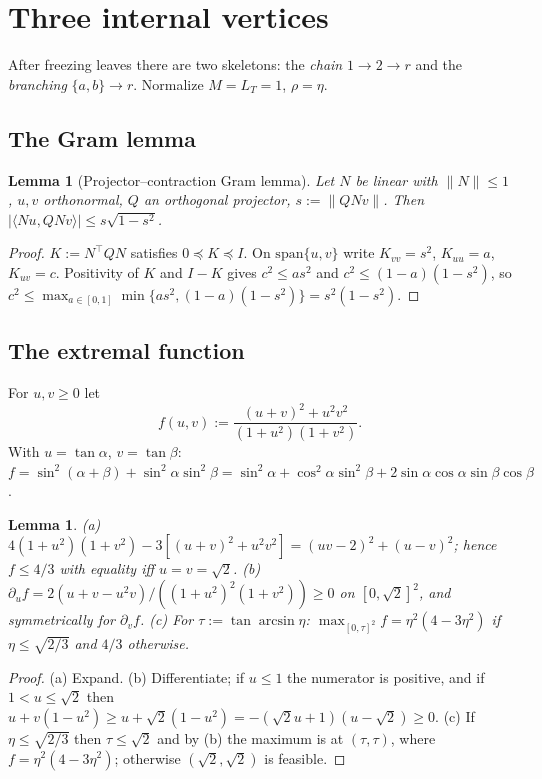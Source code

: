 \documentclass[11pt]{amsart}
\newtheorem{lemma}[theorem]{Lemma}
\theoremstyle{definition}
\newcommand{\norm}[1]{\lVert #1\rVert}
\newcommand{\ip}[2]{\langle #1,#2\rangle}
\begin{document}
\section{Three internal vertices}

After freezing leaves there are two skeletons: the \emph{chain} $1\to2\to r$ and
the \emph{branching} $\{a,b\}\to r$. Normalize $M=L_T=1$, $\rho=\eta$.

\subsection{The Gram lemma}

\begin{lemma}[Projector--contraction Gram lemma]\label{lem:gram}
Let $N$ be linear with $\norm{N}\le1$, $u,v$ orthonormal, $Q$ an orthogonal projector,
$s:=\norm{QNv}$. Then $\lvert\ip{Nu}{QNv}\rvert\le s\sqrt{1-s^2}$.
\end{lemma}
\begin{proof}
$K:=N^{\top}QN$ satisfies $0\preceq K\preceq I$. On $\mathrm{span}\{u,v\}$ write
$K_{vv}=s^2$, $K_{uu}=a$, $K_{uv}=c$. Positivity of $K$ and $I-K$ gives
$c^2\le as^2$ and $c^2\le(1-a)(1-s^2)$, so
$c^2\le\max_{a\in[0,1]}\min\{as^2,(1-a)(1-s^2)\}=s^2(1-s^2)$.
\end{proof}

\subsection{The extremal function}

For $u,v\ge0$ let
\[
f(u,v):=\frac{(u+v)^2+u^2v^2}{(1+u^2)(1+v^2)}.
\]
With $u=\tan\alpha$, $v=\tan\beta$: $f=\sin^2(\alpha+\beta)+\sin^2\alpha\sin^2\beta
=\sin^2\alpha+\cos^2\alpha\sin^2\beta+2\sin\alpha\cos\alpha\sin\beta\cos\beta$.

\begin{lemma}\label{lem:f}
\textup{(a)} $4(1+u^2)(1+v^2)-3[(u+v)^2+u^2v^2]=(uv-2)^2+(u-v)^2$; hence $f\le 4/3$
with equality iff $u=v=\sqrt2$.
\textup{(b)} $\partial_uf=2(u+v-u^2v)/((1+u^2)^2(1+v^2))\ge0$ on $[0,\sqrt2]^2$, and symmetrically
for $\partial_vf$.
\textup{(c)} For $\tau:=\tan\arcsin\eta$: $\max_{[0,\tau]^2}f=\eta^2(4-3\eta^2)$ if
$\eta\le\sqrt{2/3}$ and $4/3$ otherwise.
\end{lemma}
\begin{proof}
(a) Expand. (b) Differentiate; if $u\le1$ the numerator is positive, and if
$1<u\le\sqrt2$ then $u+v(1-u^2)\ge u+\sqrt2(1-u^2)=-(\sqrt2u+1)(u-\sqrt2)\ge0$.
(c) If $\eta\le\sqrt{2/3}$ then $\tau\le\sqrt2$ and by (b) the maximum is at
$(\tau,\tau)$, where $f=\eta^2(4-3\eta^2)$; otherwise $(\sqrt2,\sqrt2)$ is feasible.
\end{proof}
\end{document}
